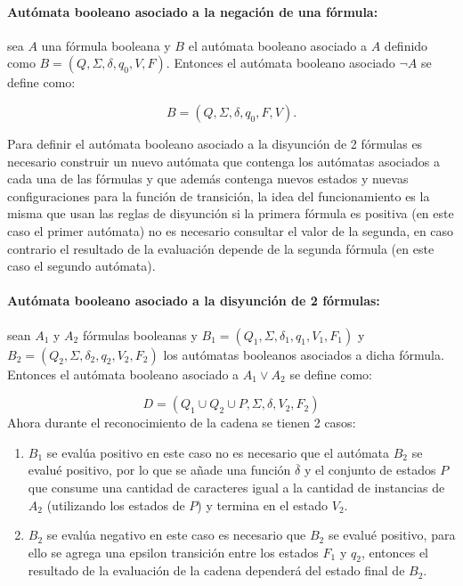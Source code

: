 \documentclass[12pt]{article}
\begin{document}
\paragraph{Autómata booleano asociado a la negación de una fórmula:} sea $A$ una fórmula booleana y $B$ el autómata booleano asociado a $A$ definido
como $B=(Q,\Sigma,\delta,q_0,V,F)$. Entonces el autómata booleano asociado $\neg A$ se define como:

$$B=(Q,\Sigma,\delta,q_0,F,V).$$

Para definir el autómata booleano asociado a la disyunción de 2 fórmulas es necesario construir un nuevo autómata que contenga los
autómatas asociados a cada una de las fórmulas y que además contenga nuevos estados y nuevas configuraciones para la función de transición,
la idea del funcionamiento es la misma que usan las reglas de disyunción si la primera fórmula es positiva (en este caso el primer autómata)
no es necesario consultar el valor de la segunda, en caso contrario el resultado de la evaluación depende de la segunda fórmula
(en este caso el segundo autómata).


\paragraph{Autómata booleano asociado a la disyunción de 2 fórmulas:} sean $A_1$ y $A_2$ fórmulas booleanas y
$B_1=(Q_1,\Sigma,\delta_1,q_1,V_1,F_1)$ y $B_2=(Q_2,\Sigma,\delta_2,q_2,V_2,F_2)$ los autómatas booleanos asociados a dicha fórmula. Entonces el autómata booleano asociado a
$A_1 \vee A_2$ se define como:

$$
      D=(Q_1\cup Q_2 \cup P,\Sigma,\delta,V_2, F_2)
$$
Ahora durante el reconocimiento de la cadena se tienen 2 casos:

\begin{enumerate}
      \item $B_1$ se evalúa positivo en este caso no es necesario que el autómata $B_2$ se evalué positivo, por lo
            que se añade una función $\overline{\delta}$ y el conjunto de estados $P$ 
            que consume una cantidad de caracteres igual a la cantidad de instancias de $A_2$ (utilizando los estados
            de $P$) y termina en el estado $V_2$.
      \item $B_2$ se evalúa negativo en este caso es necesario que $B_2$ se evalué positivo, para ello se agrega una epsilon
      transición entre los estados $F_1$ y $q_2$, entonces el resultado de la evaluación de la cadena dependerá
            del estado final de $B_2$.
\end{enumerate}
\end{document}
